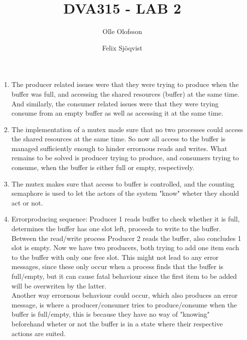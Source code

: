 \documentclass[12pt]{article}
\title{DVA315 - LAB 2}
\author{Olle Olofsson \and Felix Sjöqvist}
\begin{document}
\maketitle

\begin{enumerate}
    \item The producer related issues were that they were trying to produce when the buffer was full, and accessing the shared resources (buffer) at the same time. And similarly, the consumer related issues were that they were trying consume from an empty buffer as well as accessing it at the same time.
    \item The implementation of a mutex made sure that no two processes could access the shared resources at the same time. So now all access to the buffer is managed sufficiently enough to hinder errornous reads and writes. What remains to be solved is producer trying to produce, and consumers trying to consume, when the buffer is either full or empty, respectively.
    \item The mutex makes sure that access to buffer is controlled, and the counting semaphore is used to let the actors of the system "know" wheter they should act or not.
    \item Errorproducing sequence: Producer 1 reads buffer to check whether it is full, determines the buffer has one slot left, proceeds to write to the buffer. Between the read/write process Producer 2 reads the buffer, also concludes 1 slot is empty. Now we have two producers, both trying to add one item each to the buffer with only one free slot. This might not lead to any error messages, since these only occur when a process finds that the buffer is full/empty, but it can cause fatal behaviour since the first item to be added will be overwriten by the latter.\\Another way errornous behaviour could occur, which also produces an error message, is where a producer/consumer tries to produce/consume when the buffer is full/empty, this is because they have no way of "knowing" beforehand wheter or not the buffer is in a state where their respective actions are suited.
\end{enumerate}
\end{document}
